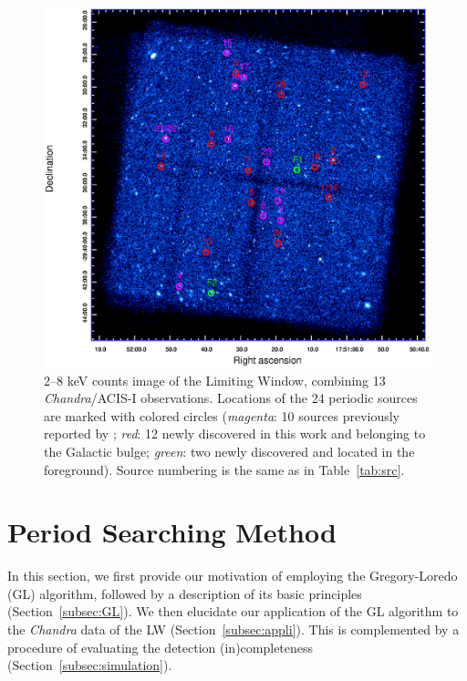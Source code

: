 \documentclass[twoside,twocolumn]{aastex63}
\begin{document}
\begin{figure}[htbp]
\centering
\includegraphics[scale=0.8]{./figure/LW/all_pCVf.eps}
\caption{2--8 keV counts image of the Limiting Window, combining 13 {\it Chandra}/ACIS-I observations. Locations of the 24 periodic sources are marked with colored circles ({\it magenta}: 10 sources previously reported by \cite{2012ApJ...746..165H}; {\it red}: 12 newly discovered in this work and belonging to the Galactic bulge; {\it green}: two newly discovered and located in the foreground). Source numbering is the same as in Table~\ref{tab:src}.}
\label{fig:FoV}
\end{figure}

\section{Period Searching Method}\label{sec:methods}
In this section, we first provide our motivation of employing the Gregory-Loredo (GL) algorithm, followed by a description of its basic principles (Section~\ref{subsec:GL}). We then elucidate our application of the GL algorithm to the {\it Chandra} data of the LW (Section~\ref{subsec:appli}). This is complemented by a procedure of evaluating the detection (in)completeness (Section~\ref{subsec:simulation}).  
\end{document}
